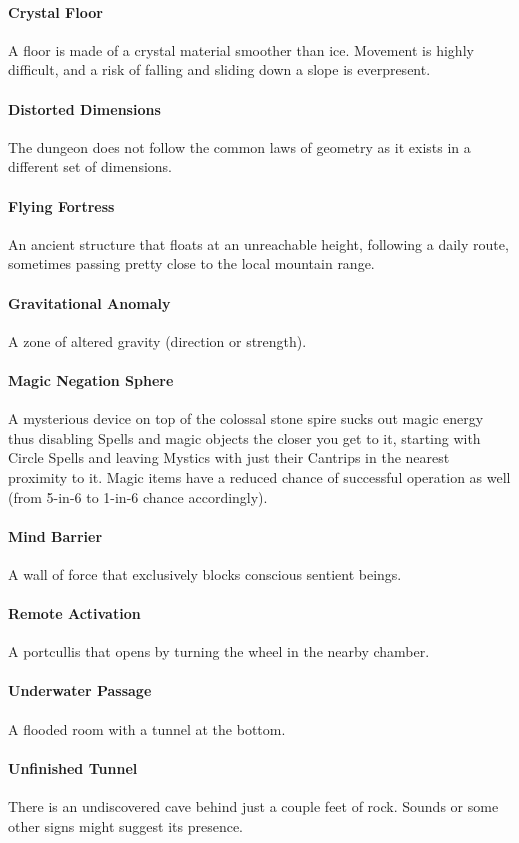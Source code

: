 \documentclass[itdr]{subfiles}
\begin{document}
\vfill
\paragraph{Crystal Floor}
A floor is made of a crystal material smoother than ice. Movement is highly difficult, and a risk of falling and sliding down a slope is everpresent.

\vfill
\paragraph{Distorted Dimensions}
The dungeon does not follow the common laws of geometry as it exists in a different set of dimensions.

\vfill
\paragraph{Flying Fortress}
An ancient structure that floats at an unreachable height, following a daily route, sometimes passing pretty close to the local mountain range.

\vfill
\paragraph{Gravitational Anomaly}
A zone of altered gravity (direction or strength).

\vfill
\paragraph{Magic Negation Sphere}
A mysterious device on top of the colossal stone spire sucks out magic energy thus disabling Spells and magic objects the closer you get to it, starting with  Circle Spells and leaving Mystics with just their Cantrips in the nearest proximity to it. Magic items have a reduced chance of successful operation as well (from 5-in-6 to 1-in-6 chance accordingly).

\vfill
\paragraph{Mind Barrier}
A wall of force that exclusively blocks conscious sentient beings.

\vfill
\paragraph{Remote Activation}
A portcullis that opens by turning the wheel in the nearby chamber.

\vfill
\paragraph{Underwater Passage}
A flooded room with a tunnel at the bottom.

\vfill
\paragraph{Unfinished Tunnel}
There is an undiscovered cave behind just a couple feet of rock. Sounds or some other signs might suggest its presence.

\vfill
\end{document}

